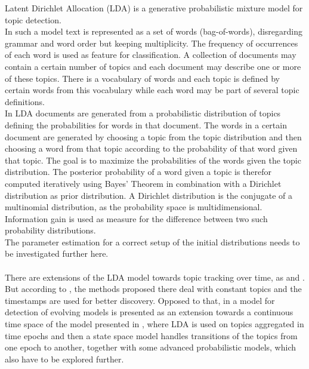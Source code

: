 Latent Dirichlet Allocation (LDA) \cite{Blei:2003:LDA:944919.944937}
 is a generative probabilistic mixture model for topic detection.
\\
In such a model text is represented as a set of words (bag-of-words), disregarding grammar and word order but keeping multiplicity. The frequency of occurrences of each word is used as feature for classification. A collection of documents may contain a certain number of topics and each document may describe one or more of these topics. There is a vocabulary of words and each topic is defined by certain words from this vocabulary while each word may be part of several topic definitions.
\\
In LDA documents are generated from a probabilistic distribution of topics defining the probabilities for words in that document. The words in a certain document are generated by choosing a topic from the topic distribution and then choosing a word from that topic according to the probability of that word given that topic. The goal is to maximize the probabilities of the words given the topic distribution.
The posterior probability of a word given a topic is therefor computed iteratively using Bayes' Theorem in combination with a Dirichlet distribution as prior distribution. A Dirichlet distribution is the conjugate of a multinomial distribution, as the probability space is multidimensional. Information gain is used as measure for the difference between two such probability distributions.
\\
The parameter estimation for a correct setup of the initial distributions needs to be investigated further here.
\\
\\
There are extensions of the LDA model towards topic tracking over time, as \cite{Wang:2006:TOT:1150402.1150450} and \cite{conf:ijcai:WeiSW07}. But according to \cite{conf:uai:WangBH08}, the methods proposed there deal with constant topics and the timestamps are used for better discovery. Opposed to that, in \cite{conf:uai:WangBH08} a model for detection of evolving models is presented as an extension towards a continuous time space of the model presented in \cite{Blei:2006:DTM:1143844.1143859}, where LDA is used on topics aggregated in time epochs and then a state space model handles transitions of the topics from one epoch to another, together with some advanced probabilistic models, which also have to be explored further.


